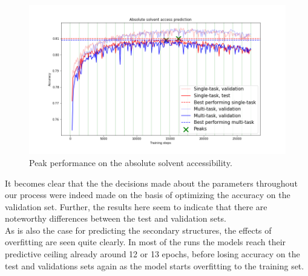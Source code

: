 \begin{figure}[H]
  \centering
  \includegraphics[width=\linewidth]{../graphs/final/abs_final_small}
  \caption{Peak performance on the absolute solvent accessibility.}
\end{figure}

\noindent It becomes clear that the the decisions made about the parameters throughout our process were indeed made on the basis of optimizing the accuracy on the validation set. Further, the results here seem to indicate that there are noteworthy differences between the test and validation sets.\\
As is also the case for predicting the secondary structures, the effects of overfitting are seen quite clearly. In most of the runs the models reach their predictive ceiling already around 12 or 13 epochs, before losing accuracy on the test and validations sets again as the model starts overfitting to the training set.

